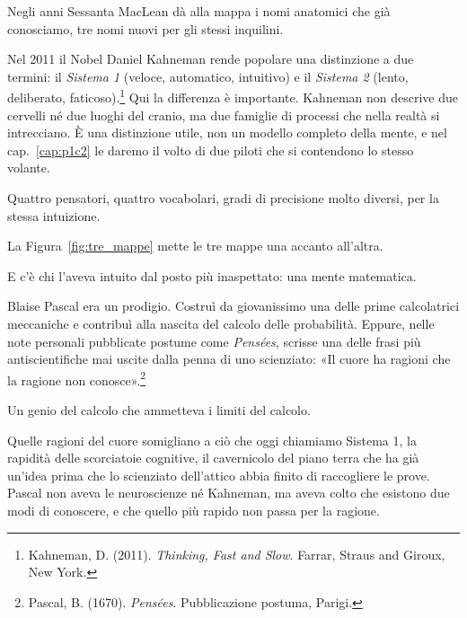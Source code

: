 Negli anni Sessanta MacLean dà alla mappa i nomi anatomici che già conosciamo, tre nomi nuovi per gli stessi inquilini.

Nel 2011 il Nobel Daniel Kahneman rende popolare una distinzione a due termini: il \textit{Sistema 1} (veloce, automatico, intuitivo) e il \textit{Sistema 2} (lento, deliberato, faticoso).\footnote{Kahneman, D. (2011). \textit{Thinking, Fast and Slow}. Farrar, Straus and Giroux, New York.} Qui la differenza è importante. Kahneman non descrive due cervelli né due luoghi del cranio, ma due famiglie di processi che nella realtà si intrecciano. È una distinzione utile, non un modello completo della mente, e nel cap.~\ref{cap:p1c2} le daremo il volto di due piloti che si contendono lo stesso volante.

Quattro pensatori, quattro vocabolari, gradi di precisione molto diversi, per la stessa intuizione.

La Figura~\ref{fig:tre_mappe} mette le tre mappe una accanto all'altra.


E c'è chi l'aveva intuito dal posto più inaspettato: una mente matematica.

Blaise Pascal era un prodigio. Costruì da giovanissimo una delle prime calcolatrici meccaniche e contribuì alla nascita del calcolo delle probabilità. Eppure, nelle note personali pubblicate postume come \textit{Pensées}, scrisse una delle frasi più antiscientifiche mai uscite dalla penna di uno scienziato: «Il cuore ha ragioni che la ragione non conosce».\footnote{Pascal, B. (1670). \textit{Pensées}. Pubblicazione postuma, Parigi.}

Un genio del calcolo che ammetteva i limiti del calcolo.

Quelle ragioni del cuore somigliano a ciò che oggi chiamiamo Sistema 1, la rapidità delle scorciatoie cognitive, il cavernicolo del piano terra che ha già un'idea prima che lo scienziato dell'attico abbia finito di raccogliere le prove. Pascal non aveva le neuroscienze né Kahneman, ma aveva colto che esistono due modi di conoscere, e che quello più rapido non passa per la ragione.

